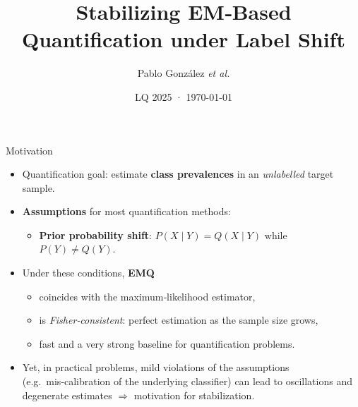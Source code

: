 \documentclass[aspectratio=169]{beamer}
\title[Stabilizing EM‑Based Quantification]{Stabilizing EM‑Based Quantification under Label Shift}
\author{Pablo González \textit{et al.}}
\institute[AI Center, Uni. Oviedo]{Artificial Intelligence Center\\University of Oviedo}
\date{LQ 2025 · \today}
\begin{document}
\begin{frame}
  \titlepage
\end{frame}

\begin{frame}{Motivation}
  \begin{itemize}
    \item \alert{Quantification goal}: estimate \textbf{class prevalences} in an \emph{unlabelled} target sample.
    \item \textbf{Assumptions} for most quantification methods:
          \begin{itemize}
            \item \textbf{Prior probability shift}: $P(X\mid Y)=Q(X\mid Y)$ while $P(Y)\neq Q(Y)$.
          \end{itemize}
    \item Under these conditions,  \textbf{EMQ}
          \begin{itemize}
            \item coincides with the maximum‑likelihood estimator,
            \item is \emph{Fisher‑consistent}: perfect estimation as the sample size grows,
            \item fast and a very strong baseline for quantification problems.
          \end{itemize}
    \item Yet, in practical problems, mild violations of the assumptions (e.g.\ mis‑calibration of the underlying classifier) can lead to oscillations and degenerate estimates $\Rightarrow$ motivation for stabilization.
  \end{itemize}
\end{frame}
\end{document}
